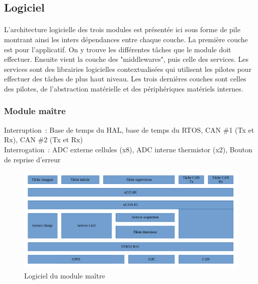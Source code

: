 \subsection{Logiciel}
	\paragraph*{}
	L'architecture logicielle des trois modules est présentée ici sous forme de pile montrant ainsi les inters dépendances entre chaque couche. La première couche est pour l'applicatif. On y trouve les différentes tâches que le module doit effectuer. Ensuite vient la couche des "middlewares", puis celle des services. Les services sont des librairies logicielles contextualisées qui utilisent les pilotes pour effectuer des tâches de plus haut niveau. Les trois dernières couches sont celles des pilotes, de l'abstraction matérielle et des périphériques matériels internes.
	\subsubsection*{Module maître}
		\noindent
		Interruption : Base de temps du HAL, base de temps du RTOS, CAN \#1 (Tx et Rx),  CAN \#2 (Tx et Rx) \\
		Interrogation : ADC externe cellules (x8), ADC interne thermistor (x2), Bouton de reprise d’erreur
		\begin{figure}[H]
			\centering
			\includegraphics[scale=0.5]{Images/Logiciel_Master.png}
			\caption{Logiciel du module maître}
			\label{fig:logiciel_master}
		\end{figure}
